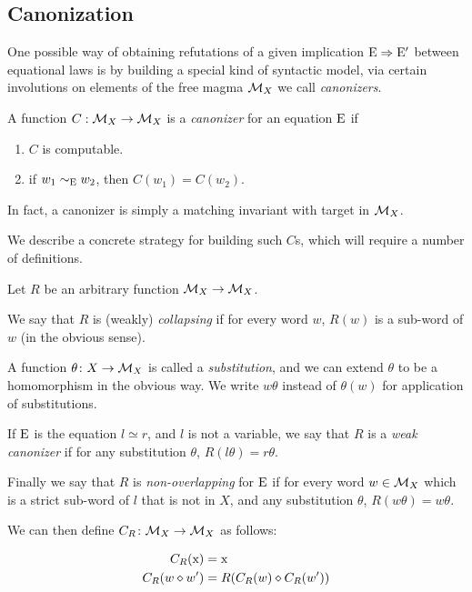 \subsection{Canonization}\label{canon-sec}

One possible way of obtaining refutations of a given implication $\mathrm{E} \Rightarrow \mathrm{E}'$ between equational laws is by building a special kind of syntactic model, via certain involutions on elements of the free magma ${\mathcal{M}}_X$ we call \emph{canonizers}.

\begin{definition}
  A function $C:{\mathcal{M}}_X\rightarrow{\mathcal{M}}_X$ is a \emph{canonizer} for an equation $\mathrm{E}$ if
  \begin{enumerate}
    \item $C$ is computable.
    \item if $w_1\sim_{\mathrm{E}} w_2$, then $C(w_1) = C(w_2)$.
  \end{enumerate}
\end{definition}

In fact, a canonizer is simply a matching invariant with target in ${\mathcal{M}}_X$.

We describe a concrete strategy for building such $C$s, which will require a number of definitions.

Let $R$ be an arbitrary function ${\mathcal{M}}_X\rightarrow {\mathcal{M}}_X$.

\begin{definition}\label{def:canon}
  We say that $R$ is (weakly) \emph{collapsing} if for every word $w$, $R(w)$ is a sub-word of $w$ (in the obvious sense).

  A function $\theta\colon X\rightarrow{\mathcal{M}}_X$ is called a \emph{substitution}, and we can extend $\theta$ to be a homomorphism in the obvious way. We write $w\theta$ instead of $\theta(w)$ for application of substitutions.

  If $\mathrm{E}$ is the equation $l\simeq r$, and $l$ is not a variable, we say that $R$ is a \emph{weak canonizer} if for any substitution $\theta$, $R(l\theta)=r\theta$.

  Finally we say that $R$ is \emph{non-overlapping} for $\mathrm{E}$ if for every word $w\in{\mathcal{M}}_X$ which is a strict sub-word of $l$ that is not in $X$, and any substitution $\theta$, $R(w\theta) = w\theta$.
\end{definition}

We can then define $C_R\colon {\mathcal{M}}_X\rightarrow{\mathcal{M}}_X$ as follows:

\begin{align}
  C_R(\mathrm{x}) &= \mathrm{x}\\
  C_R(w\diamond w') &= R(C_R(w)\diamond C_R(w'))
\end{align}

